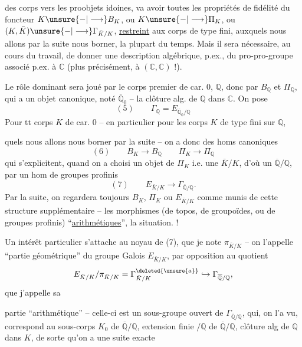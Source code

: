 des corps vers les proobjets idoines, va avoir toutes les propriétés de fidélité du foncteur $K\unsure{-|\longrightarrow}B_K$, ou $K\unsure{-|\longrightarrow}\Pi_K$, ou $(K,\bar K)\unsure{-|\longrightarrow}\Gamma_{\bar K/K}$, \uline{restreint} aux corps  de type fini, auxquels nous allons par la suite nous borner, la plupart du temps. Mais il sera nécessaire, au cours du travail, de donner une description  algébrique, p.ex., du pro-pro-groupe  associé p.ex. à $\mathbb C$ (plus précisément, à $(\mathbb C,\mathbb C)$ !).

Le rôle dominant sera joué par le corps premier de car. $0$, $\mathbb Q$, donc par $B_{\mathbb Q}$ et $\Pi_{\mathbb Q}$, qui a un objet canonique, noté $\overline{\mathbb Q}_0$ -- la clôture alg. de $\mathbb Q$ dans $\mathbb C$. On pose
\[
(5)\qquad \Gamma_{\mathbb Q}=E_{\overline{\mathbb Q}_0/\mathbb Q}
\]
Pour tt corps $K$ de car. $0$ -- en particulier pour les corps $K$ de type fini sur $\mathbb Q$, 

quels nous allons nous borner par la suite -- on a donc des homs canoniques
\[
(6)\qquad B_K\longrightarrow B_{\mathbb Q}\qquad\Pi_K\longrightarrow\Pi_{\mathbb Q}
\]
qui s'explicitent, quand on a choisi un objet de $\Pi_K$ i.e. une $\bar K/K$, d'où un $\overline{\mathbb Q}/\mathbb Q$, par un hom de groupes profinis
\[
(7)\qquad E_{\bar K/K}\longrightarrow\Gamma_{\overline{\mathbb Q}/\mathbb Q}.
\]
Par la suite, on regardera toujours $B_K$, $\Pi_K$ ou $E_{\bar K/K}$ comme munis de cette structure supplémentaire --  les morphismes (de topos, de groupoïdes, ou de groupes profinis) ``\uline{arithmétiques}'',  la situation. !

Un intérêt particulier s'attache au noyau de (7), que je note $\pi_{\bar K/K}$ -- on l'appelle ``partie géométrique'' du groupe Galois $E_{\bar K/K}$, par opposition au quotient
\[
E_{\bar K/K}/\pi_{\bar K/K}=\Gamma^{\deleted{\unsure{a}}}_{\bar K/K}\hookrightarrow\Gamma_{\overline{\mathbb Q}/\mathbb Q},
\]
que j'appelle sa

partie ``arithmétique'' -- celle-ci est un sous-groupe ouvert de $\Gamma_{\overline{\mathbb Q}/\mathbb Q}$, qui, on l'a vu, correspond au sous-corps $K_0$ de $\overline{\mathbb Q}/\mathbb Q$, extension finie $/\mathbb Q$ de $\overline{\mathbb Q}/\mathbb Q$, clôture alg de $\mathbb Q$ dans $K$, de sorte qu'on a une suite exacte

